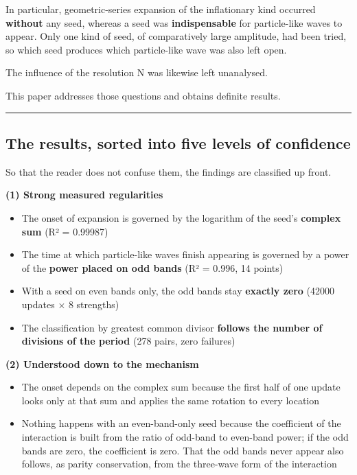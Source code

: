 \documentclass[
]{article}
\providecommand{\tightlist}{%
  \setlength{\itemsep}{0pt}\setlength{\parskip}{0pt}}
\begin{document}
In particular, geometric-series expansion of the inflationary kind
occurred \textbf{without} any seed, whereas a seed was
\textbf{indispensable} for particle-like waves to appear. Only one kind
of seed, of comparatively large amplitude, had been tried, so which seed
produces which particle-like wave was also left open.

The influence of the resolution N was likewise left unanalysed.

This paper addresses those questions and obtains definite results.

\begin{center}\rule{0.5\linewidth}{0.5pt}\end{center}

\subsection{The results, sorted into five levels of
confidence}\label{the-results-sorted-into-five-levels-of-confidence}

So that the reader does not confuse them, the findings are classified up
front.

\textbf{(1) Strong measured regularities}

\begin{itemize}
\tightlist
\item
  The onset of expansion is governed by the logarithm of the seed's
  \textbf{complex sum} (R² = 0.99987)
\item
  The time at which particle-like waves finish appearing is governed by
  a power of the \textbf{power placed on odd bands} (R² = 0.996, 14
  points)
\item
  With a seed on even bands only, the odd bands stay \textbf{exactly
  zero} (42000 updates × 8 strengths)
\item
  The classification by greatest common divisor \textbf{follows the
  number of divisions of the period} (278 pairs, zero failures)
\end{itemize}

\textbf{(2) Understood down to the mechanism}

\begin{itemize}
\tightlist
\item
  The onset depends on the complex sum because the first half of one
  update looks only at that sum and applies the same rotation to every
  location
\item
  Nothing happens with an even-band-only seed because the coefficient of
  the interaction is built from the ratio of odd-band to even-band
  power; if the odd bands are zero, the coefficient is zero. That the
  odd bands never appear also follows, as parity conservation, from the
  three-wave form of the interaction
\end{itemize}
\end{document}

